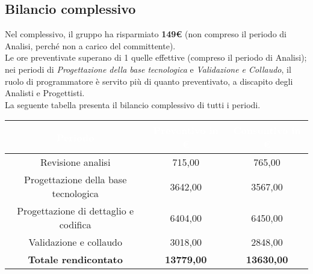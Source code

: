 \begin{flushleft}
\newpage
\section{Bilancio complessivo}\label{bilanciofinale}
	Nel complessivo, il gruppo ha risparmiato \textbf{149\euro} (non compreso il periodo di Analisi, perché non a carico del committente).\\Le ore preventivate superano di 1 quelle effettive (compreso il periodo di Analisi); nei periodi di \textit{Progettazione della base tecnologica} e \textit{Validazione e Collaudo}, il ruolo di programmatore è servito più di quanto preventivato, a discapito degli Analisti e Progettisti.\\
	La seguente tabella presenta il bilancio complessivo di tutti i periodi.\\
		\begin{table}[H]
		\begin{center}
			
			
			\begin{tabular}{ccc}
				
				\rowcolor{coolblack}
				\hline
				\textcolor{white}{Periodo} & \textcolor{white}{Preventivo in \euro} & \textcolor{white}{Consuntivo in \euro}\\
				\hline
				Revisione analisi& 715,00 & 765,00 \\ 	
				Progettazione della base tecnologica& 3642,00 & 3567,00\\ 
				Progettazione di dettaglio e codifica& 6404,00   & 6450,00\\ 
				Validazione e collaudo & 3018,00 & 2848,00\\ \hline
				\textbf{Totale rendicontato}& \textbf{13779,00} & \textbf{13630,00}	\\ \hline   
				

\end{tabular}
\end{center}
\end{table}
\end{flushleft}
